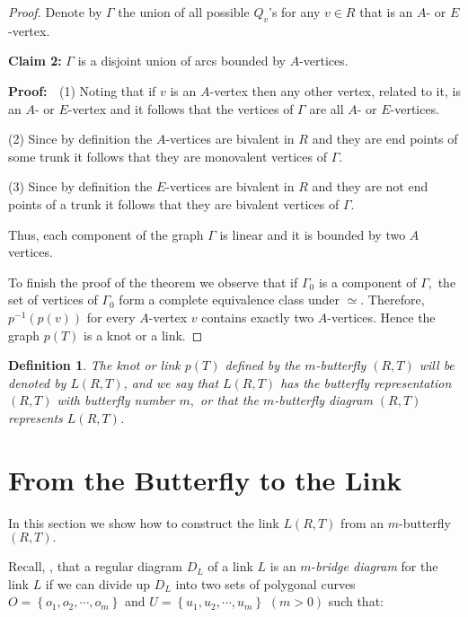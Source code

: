\documentclass{amsproc}\usepackage{eurosym}
\theoremstyle{plain}
\newtheorem{definition}{Definition}
\numberwithin{equation}{section}
\begin{document}
\begin{proof}
Denote by $\Gamma$ the union of all possible $Q_{v}$'s for any $v\in R$ that
is an $A$- or $E$-vertex.

\noindent\textbf{Claim 2:} $\Gamma$ is a disjoint union of arcs bounded by $A$-vertices.

\textbf{Proof: \ }(1) Noting that if $v$ is an $A$-vertex then any other
vertex, related to it, is an $A$- or $E$-vertex and it follows that the
vertices of $\Gamma$ are all $A$- or $E$-vertices.

(2) Since by definition the $A$-vertices are bivalent in $R$ and they are end
points of some trunk it follows that they are monovalent vertices of $\Gamma.$

(3) Since by definition the $E$-vertices are bivalent in $R$ and they are not
end points of a trunk it follows that they are bivalent vertices of $\Gamma.$

Thus, each component of the graph $\Gamma$ is linear and it is bounded by two
$A$ vertices.

To finish the proof of the theorem we observe that if $\Gamma_{0}$ is a
component of $\Gamma,$ the set of vertices of $\Gamma_{0}$ form a complete
equivalence class under $\simeq.$ Therefore, $p^{-1}\left(  p\left(  v\right)
\right)  $ for every $A$-vertex $v$ contains exactly two $A$-vertices. Hence
the graph $p\left(  T\right)  $ is a knot or a link.
\end{proof}

\begin{definition}
The knot or link $p(T)$ defined by the $m$-butterfly $\left(  R,T\right)  $
will be denoted by $L(R,T)$, and we say that $L(R,T)$ has the butterfly
representation $\left(  R,T\right)  $ with butterfly number $m,$ or that the
$m $-butterfly diagram $\left(  R,T\right)  $ represents $L(R,T)$.
\end{definition}

\section{\label{ButLink}From the Butterfly to the Link}

In this section we show how to construct the link $L(R,T)$ from an
$m$-butterfly $(R,T).$

Recall, \cite{Mu}, that a regular diagram $D_{L}$ of a link $L$ is an
$m$-\textit{bridge diagram} for the link $L$ if we can divide up $D_{L}$ into
two sets of polygonal curves $O=\left\{  o_{1},o_{2},\cdots,o_{m}\right\}  $
and $U=\left\{  u_{1},u_{2},\cdots,u_{m}\right\}  $ $(m>0)$ such that:
\end{document}
